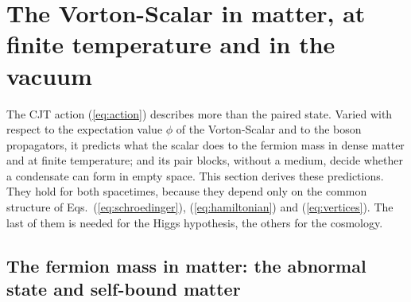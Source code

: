 
\section{The Vorton-Scalar in matter, at finite temperature and in the vacuum}
\label{sec:matter}

The CJT action (\ref{eq:action}) describes more than the paired state. Varied with respect to the
expectation value $\phi$ of the Vorton-Scalar and to the boson propagators, it predicts what the
scalar does to the fermion mass in dense matter and at finite temperature; and its pair blocks,
without a medium, decide whether a condensate can form in empty space. This section derives these
predictions. They hold for both spacetimes, because they depend only on the common structure of
Eqs.~(\ref{eq:schroedinger}), (\ref{eq:hamiltonian}) and (\ref{eq:vertices}). The last of them is
needed for the Higgs hypothesis, the others for the cosmology.

\subsection{The fermion mass in matter: the abnormal state and self-bound matter}
\label{sec:normal}

